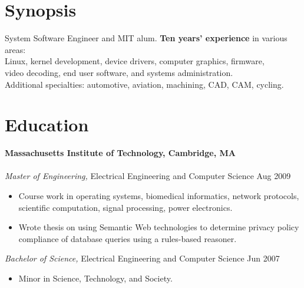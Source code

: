 \documentclass[line,margin]{res}
\begin{document}
\thispagestyle{empty}

\address{1201 West Park Street, Cedar Park, TX 78613-2801}
\address{\href{mailto:jsoltren@alum.mit.edu}{jsoltren@alum.mit.edu}
         +1 (347) 503-9558
         \url{https://www.linkedin.com/in/jsoltren}}

\begin{resume}
 
\section{Synopsis}
System Software Engineer and MIT alum. \textbf{Ten years’ experience}
in various areas:\\
Linux, kernel development, device drivers, computer graphics, firmware,\\
video decoding, end user software, and systems administration.\\
Additional specialties: automotive, aviation, machining, CAD, CAM, cycling.
 
 
\section{Education}

\textbf{Massachusetts Institute of Technology, Cambridge, MA} \\
\\
\textit{Master of Engineering,} Electrical Engineering and Computer Science
\hfill Aug 2009
\begin{itemize}  \itemsep -2pt %
\item Course work in operating systems, biomedical informatics, network
      protocols, scientific computation, signal processing, power electronics.
\item Wrote thesis on using Semantic Web technologies to determine privacy
      policy compliance of database queries using a rules-based reasoner.
\end{itemize} 
\textit{Bachelor of Science,} Electrical Engineering and Computer Science
\hfill Jun 2007
\begin{itemize}  \itemsep -2pt %
\item Minor in Science, Technology, and Society.
\end{itemize}


\end{resume}
\end{document}
